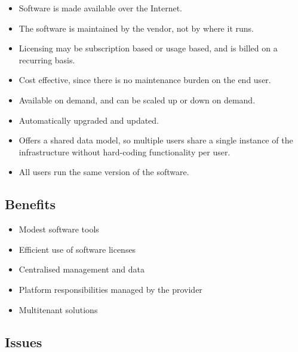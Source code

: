\documentclass[11pt,a4paper]{article}
\begin{document}
\begin{itemize}\itemsep2pt
  \item Software is made available over the Internet.
  \item The software is maintained by the vendor, not by where it runs.
  \item Licensing may be subscription based or usage based, and is billed on a recurring
        basis.
  \item Cost effective, since there is no maintenance burden on the end user.
  \item Available on demand, and can be scaled up or down on demand.
  \item Automatically upgraded and updated.
  \item Offers a shared data model, so multiple users share a single instance of the
        infrastructure without hard-coding functionality per user.
  \item All users run the same version of the software.
\end{itemize}

\subsection{Benefits}

\begin{itemize}\itemsep2pt
  \item Modest software tools
  \item Efficient use of software licenses
  \item Centralised management and data
  \item Platform responsibilities managed by the provider
  \item Multitenant solutions
\end{itemize}

\subsection{Issues}


\end{document}
